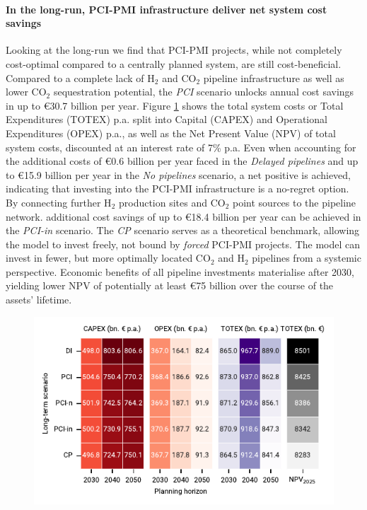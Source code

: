 \documentclass[pdflatex,sn-nature]{sn-jnl}%
\theoremstyle{thmstyleone}%
\theoremstyle{thmstyletwo}%
\theoremstyle{thmstylethree}%
\begin{document}
\paragraph{In the long-run, PCI-PMI infrastructure deliver net system cost savings}
Looking at the long-run we find that PCI-PMI projects, while not completely cost-optimal compared to a centrally planned system, are still cost-beneficial. Compared to a complete lack of H$_2$ and CO$_2$ pipeline infrastructure as well as lower CO$_2$ sequestration potential, the \textit{PCI} scenario unlocks annual cost savings in up to €30.7 billion per year. Figure \ref{fig:totex_heatmap} shows the total system costs or Total Expenditures (TOTEX) p.a. split into Capital (CAPEX) and Operational Expenditures (OPEX) p.a., as well as the Net Present Value (NPV) of total system costs, discounted at an interest rate of 7\% p.a.
Even when accounting for the additional costs of €0.6 billion per year faced in the \textit{Delayed pipelines} and up to €15.9 billion per year in the \textit{No pipelines} scenario, a net positive is achieved, indicating that investing into the PCI-PMI infrastructure is a no-regret option. By connecting further H$_2$ production sites and CO$_2$ point sources to the pipeline network. additional cost savings of up to €18.4 billion per year can be achieved in the \textit{PCI-in} scenario. The \textit{CP} scenario serves as a theoretical benchmark, allowing the model to invest freely, not bound by \textit{forced} PCI-PMI projects. The model can invest in fewer, but more optimally located CO$_2$ and H$_2$ pipelines from a systemic perspective. Economic benefits of all pipeline investments materialise after 2030, yielding lower NPV of potentially at least €75 billion over the course of the assets' lifetime. 

\begin{figure}[t]
  \centering
  \includegraphics{figures/totex_heatmap}
  \label{fig:totex_heatmap}
\end{figure}
\end{document}
